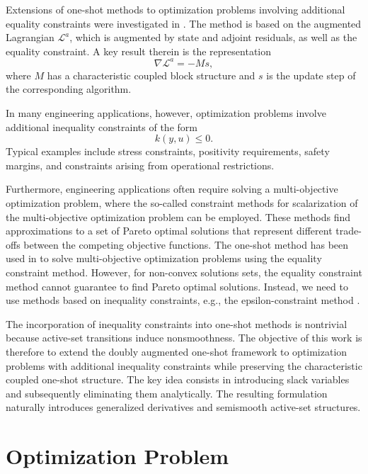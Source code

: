 \documentclass[11pt]{article}
\newcommand{\DLag}{\mathcal L^a}
\begin{document}
Extensions of one-shot methods to optimization problems involving
additional equality constraints were investigated in
\cite{walther2018, walther2018equality}. The method is based on the augmented Lagrangian $\DLag$, which is augmented by state and adjoint residuals, as well as the equality constraint. 
A key result therein is the representation
\begin{equation}
\nabla \DLag = -Ms,
\label{eq:introM}
\end{equation}
where $M$ has a characteristic coupled block structure and $s$ is the update step of the corresponding algorithm.

In many engineering applications, however, optimization problems involve additional inequality constraints of the form
\begin{equation}
k(y,u)\le 0.
\label{eq:ineq}
\end{equation}
Typical examples include stress constraints, positivity requirements, safety margins, and constraints arising from operational restrictions. 

Furthermore, engineering applications often require solving a multi-objective optimization problem, where the so-called constraint methods for scalarization of the multi-objective optimization problem can be employed. These methods find approximations to a set of Pareto optimal solutions that represent different trade-offs between the competing objective functions. The one-shot method has been used in \cite{kusch2018} to solve multi-objective optimization problems using the equality constraint method. However, for non-convex solutions sets, the equality constraint method cannot guarantee to find Pareto optimal solutions. Instead, we need to use methods based on inequality constraints, e.g., the epsilon-constraint method \cite{marglin1967}. 

The incorporation of inequality constraints into one-shot methods is nontrivial because active-set transitions induce nonsmoothness. The objective of this work is therefore to extend the doubly augmented
one-shot framework to optimization problems with additional inequality
constraints while preserving the characteristic coupled one-shot
structure. The key idea consists in introducing slack variables and subsequently
eliminating them analytically.
The resulting formulation naturally introduces generalized derivatives
and semismooth active-set structures.

\section{Optimization Problem}
\end{document}
